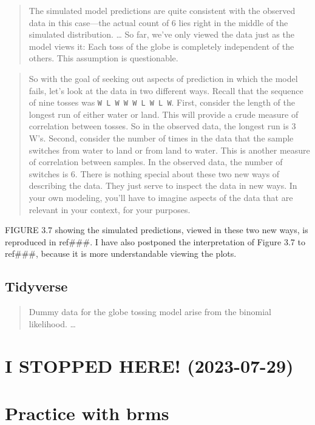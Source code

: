 \documentclass[
  letterpaper,
  DIV=11,
  numbers=noendperiod]{scrreprt}
\begin{document}
\begin{quote}
The simulated model predictions are quite consistent with the observed
data in this case---the actual count of 6 lies right in the middle of
the simulated distribution. \ldots{} So far, we've only viewed the data
just as the model views it: Each toss of the globe is completely
independent of the others. This assumption is questionable.
\end{quote}

\begin{quote}
So with the goal of seeking out aspects of prediction in which the model
fails, let's look at the data in two different ways. Recall that the
sequence of nine tosses was \texttt{W\ L\ W\ W\ W\ L\ W\ L\ W}. First,
consider the length of the longest run of either water or land. This
will provide a crude measure of correlation between tosses. So in the
observed data, the longest run is 3 W's. Second, consider the number of
times in the data that the sample switches from water to land or from
land to water. This is another measure of correlation between samples.
In the observed data, the number of switches is 6. There is nothing
special about these two new ways of describing the data. They just serve
to inspect the data in new ways. In your own modeling, you'll have to
imagine aspects of the data that are relevant in your context, for your
purposes.
\end{quote}

FIGURE 3.7 showing the simulated predictions, viewed in these two new
ways, is reproduced in ref\#\#\#. I have also postponed the
interpretation of Figure 3.7 to ref\#\#\#, because it is more
understandable viewing the plots.

\hypertarget{tidyverse-14}{%
\subsection{Tidyverse}\label{tidyverse-14}}

\begin{quote}
Dummy data for the globe tossing model arise from the binomial
likelihood. \ldots{}
\end{quote}

\hypertarget{i-stopped-here-2023-07-29}{%
\section{I STOPPED HERE! (2023-07-29)}\label{i-stopped-here-2023-07-29}}

\hypertarget{practice-with-brms}{%
\section{Practice with brms}\label{practice-with-brms}}
\end{document}
